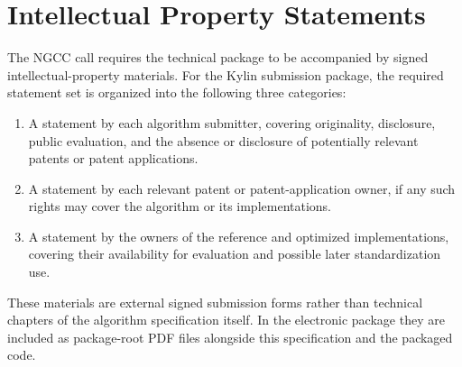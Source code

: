 \section{Intellectual Property Statements}
\label{sec:ip-statements}

The NGCC call requires the technical package to be accompanied by signed intellectual-property materials. For the Kylin submission package, the required statement set is organized into the following three categories:

\begin{enumerate}
    \item A statement by each algorithm submitter, covering originality, disclosure, public evaluation, and the absence or disclosure of potentially relevant patents or patent applications.
    \item A statement by each relevant patent or patent-application owner, if any such rights may cover the algorithm or its implementations.
    \item A statement by the owners of the reference and optimized implementations, covering their availability for evaluation and possible later standardization use.
\end{enumerate}

These materials are external signed submission forms rather than technical chapters of the algorithm specification itself. In the electronic package they are included as package-root PDF files alongside this specification and the packaged code.
